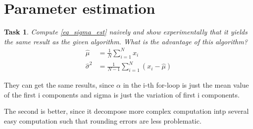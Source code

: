 \documentclass{scrartcl}
\newtheorem{task}{Task}
\begin{document}
	\section*{Parameter estimation}
	\begin{task}
		Compute \ref{eq_sigma_est} naively and show experimentally that it yields the same result as the given
		algorithm. What is the advantage of this algorithm?
		\begin{align}
			\hat{\mu} &= \frac{1}{N}\sum_{i=1}^{N}x_i \\
			\hat{\sigma}^2 &= \frac{1}{N-1}\sum_{i=1}^{N}(x_i-\hat{\mu})
			\label{eq_sigma_est}
		\end{align}
	\end{task}
	They can get the same results, since $\alpha$ in the i-th for-loop is just the mean value of the first i components and sigma is just the variation of first i components.\par 
	The second is better, since it decompose more complex computation intp several easy computation such that rounding errors are less problematic.
	
\end{document}

